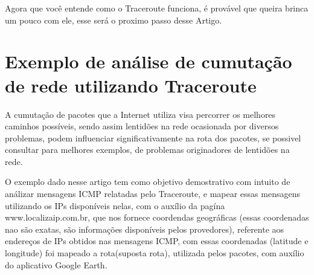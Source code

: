\documentclass[
	article,			%
	11pt,				%
	oneside,			%
	a4paper,			%
	english,			%
	brazil,				%
	sumario=tradicional
	]{abntex2}
\begin{document}
Agora que você entende como o Traceroute funciona, é provável que queira brinca um pouco com ele, esse será o proximo passo desse Artigo.

\section{Exemplo de análise de cumutação de rede utilizando Traceroute}
A cumutação de pacotes que a Internet utiliza visa percorrer os melhores caminhos possíveis, sendo assim lentid\~oes na rede ocasionada por diversos problemas, podem influenciar significativamente na rota dos pacotes, se possivel consultar \cite{Kurose} para melhores exemplos, de problemas originadores de lentid\~oes na rede. 

O exemplo dado nesse artigo tem como objetivo demostrativo com intuito de análizar mensagens ICMP relatadas pelo Traceroute, e mapear essas mensagens utilizando os IPs disponíveis nelas, com o auxílio da pagína www.localizaip.com.br, que nos fornece coordendas geográficas (essas coordenadas nao são exatas, são informações disponíveis pelos provedores), referente aos endereços de IPs obtidos nas mensagens ICMP, com essas coordenadas (latitude e longitude) foi mapeado a rota(suposta rota), utilizada pelos pacotes, com auxílio do aplicativo Google Earth. 
\end{document}
